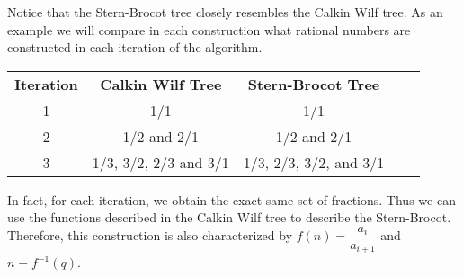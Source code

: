 \documentclass[12pt]{article}
\begin{document}
Notice that the Stern-Brocot tree closely resembles the Calkin Wilf tree. As an example we will compare in each construction what rational numbers are constructed in each iteration of the algorithm.

\begin{table}[h]
\centering \begin{tabular}{|c|c|c|ll}
\cline{1-3}
\textbf{Iteration} & \textbf{Calkin Wilf Tree} & \textbf{Stern-Brocot Tree} &  &  \\ \cline{1-3}
1                  & 1/1                                                     & 1/1                                                      &  &  \\ \cline{1-3}
2                  & 1/2 and 2/1                                             & 1/2 and 2/1                                              &  &  \\ \cline{1-3}
3                  & 1/3, 3/2, 2/3 and 3/1                                   & 1/3, 2/3, 3/2, and 3/1                                   &  &  \\ \cline{1-3}
\end{tabular}
\end{table}

In fact, for each iteration, we obtain the exact same set of fractions. Thus we can use the functions described in the Calkin Wilf tree to describe the Stern-Brocot. Therefore, this construction is also characterized by $f(n)= \dfrac{a_{i}}{a_{i+1}}$ and $n=f^{-1}(q)$. 




\end{document}

